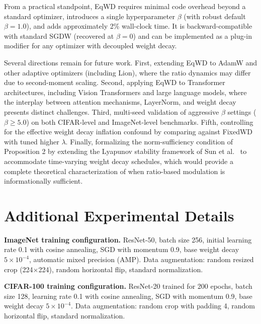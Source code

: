 \documentclass{article}
\begin{document}
From a practical standpoint, EqWD requires minimal code overhead beyond
a standard optimizer, introduces a single hyperparameter $\beta$ (with
robust default $\beta = 1.0$), and adds approximately 2\% wall-clock
time. It is backward-compatible with standard SGDW (recovered at
$\beta = 0$) and can be implemented as a plug-in modifier for any
optimizer with decoupled weight decay.

Several directions remain for future work. First, extending EqWD to
AdamW and other adaptive optimizers (including Lion), where the ratio
dynamics may differ due to second-moment scaling. Second, applying EqWD
to Transformer architectures, including Vision Transformers and large
language models, where the interplay between attention mechanisms,
LayerNorm, and weight decay presents distinct challenges. Third, multi-seed validation of
aggressive $\beta$ settings ($\beta \geq 5.0$) on both CIFAR-level
and ImageNet-level benchmarks. Fifth, controlling for the effective
weight decay inflation confound by comparing against FixedWD with tuned
higher $\lambda$. Finally, formalizing the norm-sufficiency condition
of Proposition 2 by extending the Lyapunov stability framework of Sun et
al.~\citep{sun2025cvpr} to accommodate time-varying weight decay
schedules, which would provide a complete theoretical characterization
of when ratio-based modulation is informationally sufficient.






\appendix

\section{Additional Experimental Details}
\label{app:details}

\textbf{ImageNet training configuration.} ResNet-50, batch size 256, initial learning rate 0.1 with cosine annealing, SGD with momentum 0.9, base weight decay $5 \times 10^{-4}$, automatic mixed precision (AMP). Data augmentation: random resized crop (224$\times$224), random horizontal flip, standard normalization.

\textbf{CIFAR-100 training configuration.} ResNet-20 trained for 200 epochs, batch size 128, learning rate 0.1 with cosine annealing, SGD with momentum 0.9, base weight decay $5 \times 10^{-4}$. Data augmentation: random crop with padding 4, random horizontal flip, standard normalization.
\end{document}
